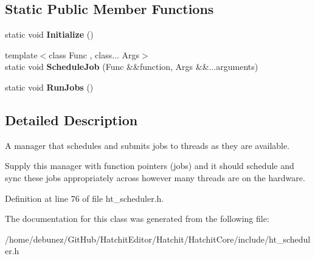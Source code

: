 \subsection*{Static Public Member Functions}
\begin{DoxyCompactItemize}
\item 
static void {\bfseries Initialize} ()\hypertarget{classHatchit_1_1Core_1_1Scheduler_aaaa1302b7bbc52e75bc4c23b8d6f016a}{}\label{classHatchit_1_1Core_1_1Scheduler_aaaa1302b7bbc52e75bc4c23b8d6f016a}

\item 
{\footnotesize template$<$class Func , class... Args$>$ }\\static void {\bfseries Schedule\+Job} (Func \&\&function, Args \&\&...arguments)\hypertarget{classHatchit_1_1Core_1_1Scheduler_a078c9f11edc0ab0f1b595e9298374d6f}{}\label{classHatchit_1_1Core_1_1Scheduler_a078c9f11edc0ab0f1b595e9298374d6f}

\item 
static void {\bfseries Run\+Jobs} ()\hypertarget{classHatchit_1_1Core_1_1Scheduler_a47863a38c261d59ae9b5e91d2ba521fd}{}\label{classHatchit_1_1Core_1_1Scheduler_a47863a38c261d59ae9b5e91d2ba521fd}

\end{DoxyCompactItemize}


\subsection{Detailed Description}
A manager that schedules and submits jobs to threads as they are available. 

Supply this manager with function pointers (jobs) and it should schedule and sync these jobs appropriately across however many threads are on the hardware. 

Definition at line 76 of file ht\+\_\+scheduler.\+h.



The documentation for this class was generated from the following file\+:\begin{DoxyCompactItemize}
\item 
/home/debunez/\+Git\+Hub/\+Hatchit\+Editor/\+Hatchit/\+Hatchit\+Core/include/ht\+\_\+scheduler.\+h\end{DoxyCompactItemize}
